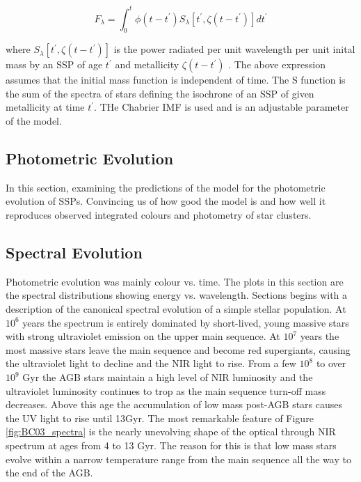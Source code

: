 \documentclass{literature}
\begin{document}
\begin{equation}
F_{\lambda} = \int ^{t} _{0} \phi(t - t^{\prime})S_{\lambda}[t^{\prime}, \zeta (t - t^{\prime})]dt^{\prime}
\end{equation}

where $S_{\lambda}[t^{\prime}, \zeta (t - t^{\prime})]$ is the power radiated per unit wavelength per unit inital mass by an SSP of age $t^{\prime}$ and metallicity $\zeta (t - t^{\prime})$ \citep{Tinsley_1980}. The above expression assumes that the initial mass function is independent of time. The S function is the sum of the spectra of stars defining the isochrone of an SSP of given metallicity at time $t^{\prime}$. THe Chabrier IMF is used and is an adjustable parameter of the model. 


\subsection{Photometric Evolution}
In this section, examining the predictions of the model for the photometric evolution of SSPs. Convincing us of how good the model is and how well it reproduces observed integrated colours and photometry of star clusters. 

\subsection{Spectral Evolution}
Photometric evolution was mainly colour vs. time. The plots in this section are the spectral distributions showing energy vs. wavelength. Sections begins with a description of the canonical spectral evolution of a simple stellar population. At $10^{6}$ years the spectrum is entirely dominated by short-lived, young massive stars with strong ultraviolet emission on the upper main sequence. At $10^{7}$ years the most massive stars leave the main sequence and become red supergiants, causing the ultraviolet light to decline and the NIR light to rise. From a few $10^{8}$ to over $10^{9}$ Gyr the AGB stars maintain a high level of NIR luminosity and the ultraviolet luminosity continues to trop as the  main sequence turn-off mass decreases. Above this age the accumulation of low mass post-AGB stars causes the UV light to rise until 13Gyr. The most remarkable feature of Figure \ref{fig:BC03_spectra} is the nearly unevolving shape of the optical through NIR spectrum at ages from 4 to 13 Gyr. The reason for this is that low mass stars evolve within a narrow temperature range from the main sequence all the way to the end of the AGB.  
\end{document}
